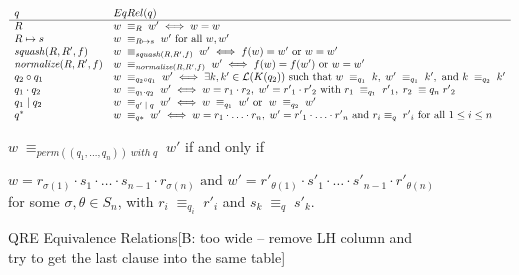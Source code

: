 \documentclass{svproc}
\newcommand{\FINISH}[3]{\ifdraft\textcolor{#1}{[#2: #3]}\fi}
\newcommand{\bcp}[1]{\FINISH{dkred}{B}{#1}}
\newcommand{\squash}[3]{\ensuremath{\mathit{squash}(#1, #2, #3)}}
\newcommand{\perm}[2]{\ensuremath{\mathit{perm}(#1)\; \mathit{with}\; #2}}
\newcommand{\normalize}[3]{\ensuremath{\mathit{normalize}(#1, #2, #3)}}
\newcommand{\sep}{\ensuremath{\; | \;}}
\begin{document}
\begin{figure}[t]
  \begin{center}
\[
    \begin{array}{l@{\quad}l} 
      q & EqRel(q)  \\ \hline
      R & w \; \equiv_R \; w' \iff w = w \\
      R \mapsto s & w \; \equiv_{R \mapsto s} \; w' \text{ for all }w, w'\\
      \squash{R}{R'}{f} & w \; \equiv_{\squash{R}{R'}{f}} \; w' \iff f(w) = w'
      \text{ or } w = w' \\
      \normalize{R}{R'}{f} & w \; \equiv_{\normalize{R}{R'}{f}} \; w' \iff
      f(w)=f(w') \text{ or }w = w'\\
      q_2 \circ  q_1 &  w \; \equiv_{q_2 \circ q_1} \; w' \iff \exists k, k' \in
  \mathcal{L}(K(q_2)) \text{ such that } w \; \equiv_{q_1} \; k, \; w' \;
  \equiv_{q_1} \; k', \text{ and } k \; \equiv_{q_2} \; k'\\
      q_1 \cdot q_2 &  w \; \equiv_{q_1 \cdot q_2} \; w'  \iff w = r_1
      \cdot r_2, \; w' = {r'}_1 \cdot {r'}_2 \text{ with } r_1 \; \equiv_{q_1}
      \; {r'}_1, \; r_2 \; \equiv{q_n} \; {r'}_2\\
      q_1 \sep q_2 &  w \; \equiv_{q' \sep q} \; w' \iff w \; \equiv_{q_1} \; w'
      \text{ or } \; w \; \equiv_{q_2} \; w'\\
      q^* &  w \; \equiv_{q*} \; w' \iff w = r_1 \cdot \ldots \cdot r_n, \; w'
      = {r'}_1 \cdot \ldots \cdot {r'}_n \text{ and } r_i \equiv_{q} \; {r'}_i
      \text{ for all } 1 \leq i \leq n\\
    \end{array}
    \]
    \end{center}
    $w \; \equiv_{\perm{(q_1, \ldots, q_n)}{q}} \; w' $ if and only if
    
    $w = r_{\sigma(1)} \cdot s_1 \cdot \ldots \cdot s_{n-1} \cdot r_{\sigma(n)}
    \text{ and } w' = {r'}_{\theta(1)} \cdot s'_1 \cdot \ldots \cdot s'_{n-1}
    \cdot {r'}_{\theta(n)}$ for some $\sigma, \theta \in S_n$, with $r_i \;
    \equiv_{q_i} \; r'_i$ and $s_k \; \equiv_{q} \; s'_{k}$.
  \caption{QRE Equivalence Relations\bcp{too wide -- remove LH column and
      try to get the last clause into the same table}}
  \label{fig:relations}
\end{figure}
\end{document}
